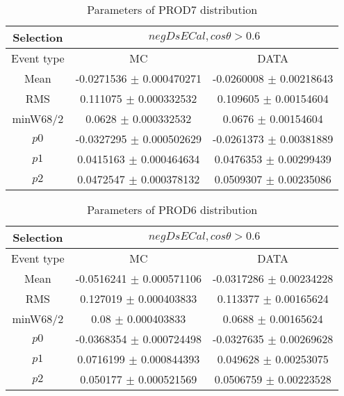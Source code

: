 \documentclass[a4paper,12pt]{article}
\begin{document}
\begin{table}[htbp]
\begin{center}
\begin{tabular}{|c|c|c|}
        \hline
        Selection & \multicolumn{2}{|c|}{$negDsECal, cos\theta>0.6$}  \\ \hline
        Event type & MC & DATA \\ 
        \hline
        Mean & -0.0271536 $\pm$ 0.000470271 & -0.0260008 $\pm$ 0.00218643 \\ 
        \hline 
        RMS & 0.111075 $\pm$ 0.000332532 & 0.109605 $\pm$ 0.00154604 \\ 
        \hline 
        minW68/2 & 0.0628 $\pm$ 0.000332532 & 0.0676 $\pm$ 0.00154604 \\ 
        \hline 
        $p0$ & -0.0327295 $\pm$ 0.000502629 & -0.0261373 $\pm$ 0.00381889 \\ 
        \hline 
        $p1$ & 0.0415163 $\pm$ 0.000464634 & 0.0476353 $\pm$ 0.00299439 \\ 
        \hline 
        $p2$ & 0.0472547 $\pm$ 0.000378132 & 0.0509307 $\pm$ 0.00235086 \\ 
        \hline 
\end{tabular}
\caption{Parameters of PROD7 distribution } \vspace{0.2in}
\label{xxx}
\end{center}
\end{table}
\begin{table}[htbp]
\begin{center}
\begin{tabular}{|c|c|c|}
        \hline
        Selection & \multicolumn{2}{|c|}{$negDsECal, cos\theta>0.6$}  \\ \hline
        Event type & MC & DATA \\ 
        \hline
        Mean & -0.0516241 $\pm$ 0.000571106 & -0.0317286 $\pm$ 0.00234228 \\ 
        \hline 
        RMS & 0.127019 $\pm$ 0.000403833 & 0.113377 $\pm$ 0.00165624 \\ 
        \hline 
        minW68/2 & 0.08 $\pm$ 0.000403833 & 0.0688 $\pm$ 0.00165624 \\ 
        \hline 
        $p0$ & -0.0368354 $\pm$ 0.000724498 & -0.0327635 $\pm$ 0.00269628 \\ 
        \hline 
        $p1$ & 0.0716199 $\pm$ 0.000844393 & 0.049628 $\pm$ 0.00253075 \\ 
        \hline 
        $p2$ & 0.050177 $\pm$ 0.000521569 & 0.0506759 $\pm$ 0.00223528 \\ 
        \hline 
\end{tabular}
\caption{Parameters of PROD6 distribution } \vspace{0.2in}
\label{xxx}
\end{center}
\end{table}
\end{document}
